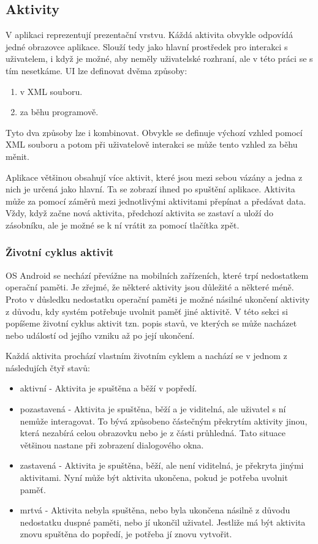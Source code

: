\documentclass[12pt]{article}
\begin{document}
\subsection{Aktivity}
V aplikaci reprezentují prezentační vrstvu. Káždá aktivita obvykle odpovídá jedné obrazovce aplikace. Slouží tedy jako hlavní prostředek pro interakci s uživatelem, i když je možné, aby neměly uživatelské rozhraní, ale v této práci se s tím nesetkáme. UI lze definovat dvěma způsoby:
\begin{enumerate}
\item v XML souboru.
\item za běhu programově.
\end{enumerate}
Tyto dva způsoby lze i kombinovat. Obvykle se definuje výchozí vzhled pomocí XML souboru a potom při uživatelově interakci se může tento vzhled za běhu měnit.

Aplikace většinou obsahují více aktivit, které jsou mezi sebou vázány a jedna z nich je určená jako hlavní. Ta se zobrazí ihned po spuštění aplikace. Aktivita může za pomocí záměrů mezi jednotlivými aktivitami přepínat a předávat data. Vždy, když začne nová aktivita, předchozí aktivita se zastaví a uloží do zásobníku, ale je možné se k ní vrátit za pomocí tlačítka zpět.
\subsubsection{Životní cyklus aktivit}
OS Android se nechází převážne na mobilních zařízeních, které trpí nedostatkem operační paměti. Je zřejmé, že některé aktivity jsou důležité a některé méně. Proto v důsledku nedostatku operační paměti je možné násilné ukončení aktivity z důvodu, kdy systém potřebuje uvolnit paměť jiné aktivitě. V této sekci si popíšeme životní cyklus aktivit tzn. popis stavů, ve kterých se může nacházet nebo událostí od jejího vzniku až po její ukončení.

Každá aktivita prochází vlastním životním cyklem a nachází se v jednom z následujích čtyř stavů:
\begin{itemize}
\item aktivní - Aktivita je spuštěna a běží v popředí.
\item pozastavená - Aktivita je spuštěna, běží a je viditelná, ale uživatel s ní nemůže interagovat. To bývá způsobeno částečným překrytím aktivity jinou, která nezabírá celou obrazovku nebo je z části průhledná. Tato situace většinou nastane při zobrazení dialogového okna.
\item zastavená - Aktivita je spuštěna, běží, ale není viditelná, je překryta jinými aktivitami. Nyní může být aktivita ukončena, pokud je potřeba uvolnit paměť.
\item mrtvá - Aktivita nebyla spuštěna, nebo byla ukončena  násilně z důvodu nedostatku duspné paměti, nebo jí ukončil uživatel. Jestliže má být aktivita znovu spuštěna do popředí, je potřeba jí znovu vytvořit.
\end{itemize}
\end{document}
